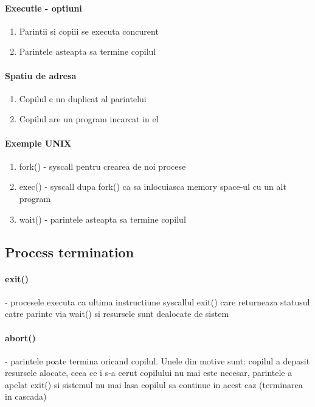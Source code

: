 \documentclass{article}
\begin{document}
\paragraph*{Executie - optiuni}
\begin{enumerate}
    \item Parintii si copiii se executa concurent
    \item Parintele asteapta sa termine copilul
\end{enumerate}

\paragraph*{Spatiu de adresa}
\begin{enumerate}
    \item Copilul e un duplicat al parintelui
    \item Copilul are un program incarcat in el
\end{enumerate}

\paragraph*{Exemple UNIX}
\begin{enumerate}
    \item fork() - syscall pentru crearea de noi procese
    \item exec() - syscall dupa fork() ca sa inlocuiasca memory space-ul cu un alt program
    \item wait() - parintele asteapta sa termine copilul
\end{enumerate}

\subsection*{Process termination}
\paragraph*{exit()} - procesele executa ca ultima instructiune syscallul exit() care returneaza statusul catre parinte via wait() si resursele sunt dealocate de sistem
\paragraph*{abort()} - parintele poate termina oricand copilul. Unele din motive sunt: copilul a depasit resursele alocate, ceea ce i s-a cerut copilului nu mai este necesar, parintele a apelat exit() si sistemul nu mai lasa copilul sa continue in acest caz (terminarea in cascada)
\end{document}

